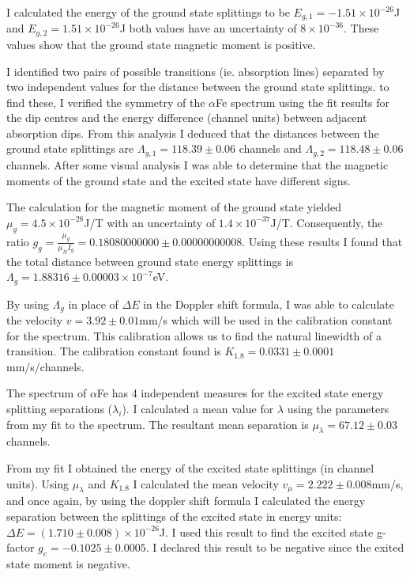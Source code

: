 \documentclass[a4paper, twocolumn]{article}
\begin{document}
I calculated the energy of the ground state splittings to be $E_{g,1} = -1.51\times10^{-26}$J and $E_{g,2} = 1.51\times10^{-26}$J both values have an uncertainty of $8\times10^{-36}$. These values show that the ground state magnetic moment is positive.

I identified two pairs of possible transitions (ie. absorption lines) separated by two independent values for the distance between the ground state splittings. to find these, I verified the symmetry of the $\alpha$Fe spectrum using the fit results for the dip centres and the energy difference (channel units) between adjacent absorption dips. From this analysis I deduced that the distances between the ground state splittings are $\Lambda_{g,1} = 118.39\pm 0.06$ channels and $\Lambda_{g,2} = 118.48\pm 0.06$ channels. After some visual analysis I was able to determine that the magnetic moments of the ground state and the excited state have different signs.

The calculation for the magnetic moment of the ground state yielded $\mu_g = 4.5\times10^{-28}$J/T with an uncertainty of $1.4\times10^{-37}$J/T. Consequently, the ratio $g_g = \frac{\mu_g}{\mu_N I_g} = 0.18080000000\pm 0.00000000008$. Using these results I found that the total distance between ground state energy splittings is $\Lambda_g = 1.88316\pm 0.00003\times10^{-7}$eV.

By using $\Lambda_g$ in place of $\Delta E$ in the Doppler shift formula, I was able to calculate the velocity $v = 3.92\pm0.01$mm/s which will be used in the calibration constant for the spectrum. This calibration allows us to find the natural linewidth of a transition. The calibration constant found is $K_{1.8} = 0.0331\pm0.0001$mm/s/channels.




The spectrum of $\alpha$Fe has 4 independent measures for the excited state energy splitting separations ($\lambda_i$). I calculated a mean value for $\lambda$ using the parameters from my fit to the spectrum. The resultant mean separation is $\mu_{\lambda} = 67.12\pm0.03$ channels.

From my fit I obtained the energy of the excited state splittings (in channel units). Using $\mu_{\lambda}$ and $K_{1.8}$ I calculated the mean velocity $v_{\mu} = 2.222\pm0.008$mm/s, and once again, by using the doppler shift formula I calculated the energy separation between the splittings of the excited state in energy units: $\Delta E = (1.710\pm0.008)\times10^{-26}$J. I used this result to find the excited state g-factor $g_e = -0.1025\pm0.0005$. I declared this result to be negative since the exited state moment is negative.
\end{document}
